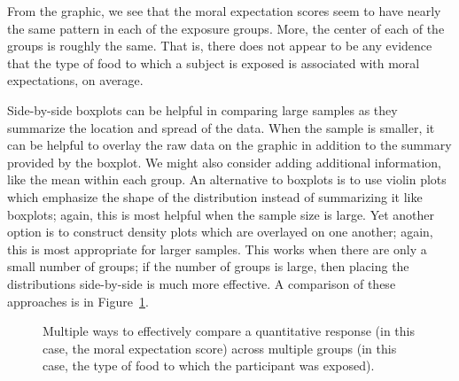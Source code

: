 \documentclass[
  letterpaper,
  DIV=11,
  numbers=noendperiod]{scrreprt}
\theoremstyle{definition}
\theoremstyle{definition}
\theoremstyle{plain}
\theoremstyle{remark}
\begin{document}
From the graphic, we see that the moral expectation scores seem to have
nearly the same pattern in each of the exposure groups. More, the center
of each of the groups is roughly the same. That is, there does not
appear to be any evidence that the type of food to which a subject is
exposed is associated with moral expectations, on average.

Side-by-side boxplots can be helpful in comparing large samples as they
summarize the location and spread of the data. When the sample is
smaller, it can be helpful to overlay the raw data on the graphic in
addition to the summary provided by the boxplot. We might also consider
adding additional information, like the mean within each group. An
alternative to boxplots is to use violin plots which emphasize the shape
of the distribution instead of summarizing it like boxplots; again, this
is most helpful when the sample size is large. Yet another option is to
construct density plots which are overlayed on one another; again, this
is most appropriate for larger samples. This works when there are only a
small number of groups; if the number of groups is large, then placing
the distributions side-by-side is much more effective. A comparison of
these approaches is in
Figure~\ref{fig-anovasummaries-organic-comparison}.

\begin{figure}


\caption{\label{fig-anovasummaries-organic-comparison}Multiple ways to
effectively compare a quantitative response (in this case, the moral
expectation score) across multiple groups (in this case, the type of
food to which the participant was exposed).}

\end{figure}%
\end{document}
